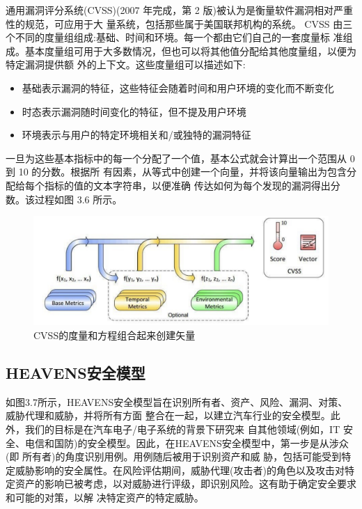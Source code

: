 通用漏洞评分系统(CVSS)(2007 年完成，第 2 版)被认为是衡量软件漏洞相对严重性的规范，可应用于大
量系统，包括那些属于美国联邦机构的系统\cite{mell2007common}。
CVSS 由三个不同的度量组组成:基础、时间和环境。每一个都由它们自己的一套度量标
准组成。基本度量组可用于大多数情况，但也可以将其他值分配给其他度量组，以便为特定漏洞提供额
外的上下文。这些度量组可以描述如下:
\begin{itemize}
    \item  基础表示漏洞的特征，这些特征会随着时间和用户环境的变化而不断变化
    \item  时态表示漏洞随时间变化的特征，但不提及用户环境
    \item  环境表示与用户的特定环境相关和/或独特的漏洞特征
\end{itemize}

一旦为这些基本指标中的每一个分配了一个值，基本公式就会计算出一个范围从 0 到 10 的分数。根据所
有因素，从等式中创建一个向量，并将该向量输出为包含分配给每个指标的值的文本字符串，以便准确
传达如何为每个发现的漏洞得出分数。该过程如图 3.6 所示。
\begin{figure}
    \centering
    \includegraphics[scale=0.6]{resources/img/i9.png}
    \caption{CVSS的度量和方程组合起来创建矢量}
  \end{figure}

  \subsection[]{HEAVENS安全模型}
  如图3.7所示，HEAVENS安全模型旨在识别所有者、资产、风险、漏洞、对策、威胁代理和威胁，并将所有方面
整合在一起，以建立汽车行业的安全模型。此外，我们的目标是在汽车电子/电子系统的背景下研究来
自其他领域(例如，IT 安全、电信和国防)的安全模型。因此，在HEAVENS安全模型中，第一步是从涉众(即
所有者)的角度识别用例。用例随后被用于识别资产和威
胁，包括可能受到特定威胁影响的安全属性。在风险评估期间，威胁代理(攻击者)的角色以及攻击对特
定资产的影响已被考虑，以对威胁进行评级，即识别风险。这有助于确定安全要求和可能的对策，以解
决特定资产的特定威胁。


